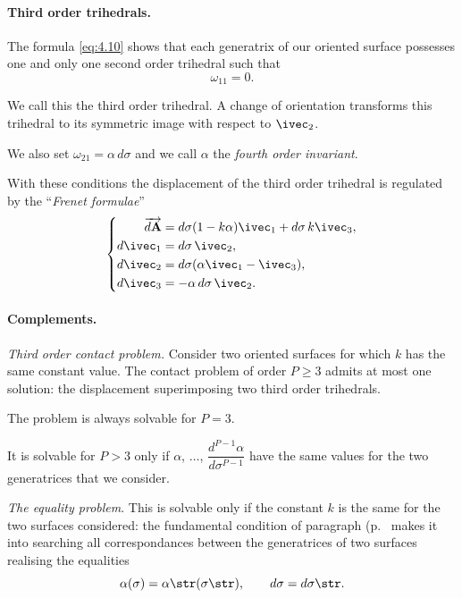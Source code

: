 \paragraph{Third order trihedrals.}
\label{sec:54}
The formula \eqref{eq:4.10} shows that each generatrix of our oriented surface possesses one and only one second order trihedral such that
\[
\omega_{11}=0.
\]

We call this the third order trihedral. A change of orientation transforms this trihedral to its symmetric image with respect to $\ivec_{2}$.

We also set $\omega_{21}=\alpha\,d\sigma$ and we call $\alpha$ the \emph{fourth order invariant}.

With these conditions the displacement of the third order trihedral is regulated by the ``\emph{Frenet formulae}''
\begin{equation}
  \label{eq:4.11}
  \left\{
    \begin{aligned}
      \overrightarrow{d\mathbf{A}}&=d\sigma(1-k\alpha)\ivec_{1}+d\sigma\,k\ivec_{3},\\
      d\ivec_{1}&=d\sigma\,\ivec_{2},\\
      d\ivec_{2}&=d\sigma(\alpha\ivec_{1}-\ivec_{3}),\\
      d\ivec_{3}&=-\alpha\,d\sigma\,\ivec_{2}.
    \end{aligned}
  \right.
\end{equation}

\paragraph{Complements.}
\label{sec:55}
\emph{Third order contact problem.} Consider two oriented surfaces for which $k$ has the same constant value. The contact problem of order $P\ge 3$ admits at most one solution: the displacement superimposing two third order trihedrals.

The problem is always solvable for $P=3$.

It is solvable for $P>3$ only if $\alpha$, $\dots$, $\dfrac{d^{P-1}\alpha}{d\sigma^{P-1}}$ have the same values for the two generatrices that we consider.

\somespace

\emph{The equality problem}. This is solvable only if the constant $k$ is the same for the two surfaces considered: the fundamental condition of paragraph  (p.~\pageref{sec:26} makes it into searching all correspondances between the generatrices of two surfaces realising the equalities
\[
\alpha(\sigma)=\alpha\str(\sigma\str),\qquad d\sigma=d\sigma\str.
\]

